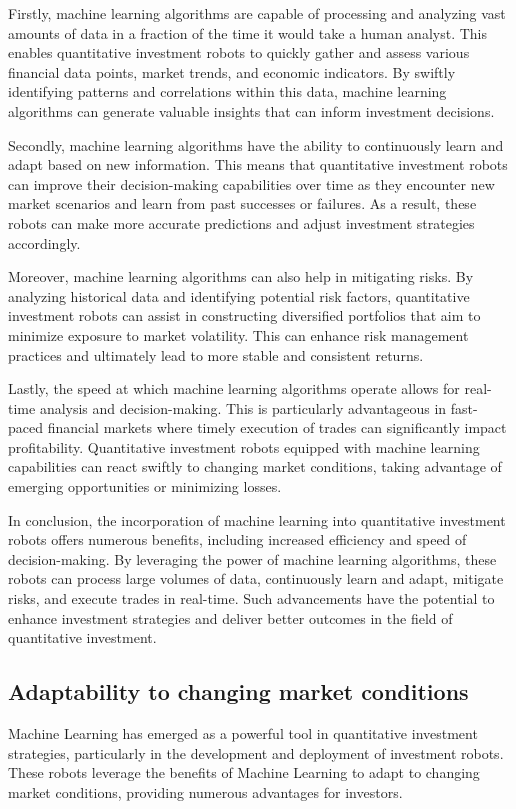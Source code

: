 \documentclass[UTF8]{ctexart}
\begin{document}
Firstly, machine learning algorithms are capable of processing and analyzing vast amounts of data in a fraction of the time it would take a human analyst. This enables quantitative investment robots to quickly gather and assess various financial data points, market trends, and economic indicators. By swiftly identifying patterns and correlations within this data, machine learning algorithms can generate valuable insights that can inform investment decisions.

Secondly, machine learning algorithms have the ability to continuously learn and adapt based on new information. This means that quantitative investment robots can improve their decision-making capabilities over time as they encounter new market scenarios and learn from past successes or failures. As a result, these robots can make more accurate predictions and adjust investment strategies accordingly.

Moreover, machine learning algorithms can also help in mitigating risks. By analyzing historical data and identifying potential risk factors, quantitative investment robots can assist in constructing diversified portfolios that aim to minimize exposure to market volatility. This can enhance risk management practices and ultimately lead to more stable and consistent returns.

Lastly, the speed at which machine learning algorithms operate allows for real-time analysis and decision-making. This is particularly advantageous in fast-paced financial markets where timely execution of trades can significantly impact profitability. Quantitative investment robots equipped with machine learning capabilities can react swiftly to changing market conditions, taking advantage of emerging opportunities or minimizing losses.

In conclusion, the incorporation of machine learning into quantitative investment robots offers numerous benefits, including increased efficiency and speed of decision-making. By leveraging the power of machine learning algorithms, these robots can process large volumes of data, continuously learn and adapt, mitigate risks, and execute trades in real-time. Such advancements have the potential to enhance investment strategies and deliver better outcomes in the field of quantitative investment.


\subsection{Adaptability to changing market conditions}
Machine Learning has emerged as a powerful tool in quantitative investment strategies, particularly in the development and deployment of investment robots. These robots leverage the benefits of Machine Learning to adapt to changing market conditions, providing numerous advantages for investors.
\end{document}
